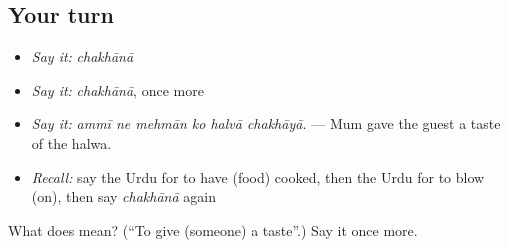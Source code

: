 \subsection*{Your turn}
\begin{itemize}
\raggedright
  \item \emph{Say it:} \emph{chakhānā}
  \item \emph{Say it:} \emph{chakhānā}, once more
  \item \emph{Say it:} \emph{ammī ne mehmān ko halvā chakhāyā.} — Mum gave the guest a taste of the halwa.
  \item \emph{Recall:} say the Urdu for to have (food) cooked, then the Urdu for to blow (on), then say \emph{chakhānā} again
\end{itemize}

\begin{tcolorbox}[breakable,colback=teal!4,colframe=teal!35!black,title={Before you move on}]
What does  mean? (\textquotedblleft{}To give (someone) a taste\textquotedblright{}.) Say it once more.
\end{tcolorbox}
